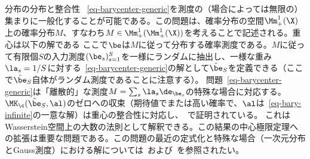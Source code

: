 \begin{rem2}{分布の分布と整合性}
	~\eqref{eq-barycenter-generic}を測度の（場合によっては無限の）集まりに一般化することが可能である。この問題は、確率分布の空間$\Mm_+^1(\X)$上の確率分布$M$、すなわち$M \in \Mm_+^1(\Mm_+^1(\X))$を考えることで記述される。重心は以下の解である
	ここで$\be$は$M$に従って分布する確率測度である。$M$に従って有限個$S$の入力測度$(\be_s)_{s=1}^S$を一様にランダムに抽出し、一様な重み$\la_s=1/S$に対する~\eqref{eq-barycenter-generic}の解として$\hat \be_S$を定義できる（ここで$\hat \be_S$自体がランダム測度であることに注意する）。
	問題~\eqref{eq-barycenter-generic}は「離散的」な測度$M=\sum_s \la_s \de_{\be_s}$の特殊な場合に対応する。
	$\MK_{\c}(\hat\be_S,\al)$のゼロへの収束（期待値でまたは高い確率で、$\al$は~\eqref{eq-bary-infinite}の一意な解）は重心の整合性に対応し、~\citep{BigotBarycenter,leGouic2016existence,bigot2012characterization}で証明されている。
	これはWasserstein空間上の大数の法則として解釈できる。この結果の中心極限定理への拡張は重要な問題である。この問題の最近の定式化と特殊な場合（一次元分布とGauss測度）における解については~\citep{panaretos2016amplitude}および~\citep{agueh2017vers}を参照されたい。
\end{rem2}


